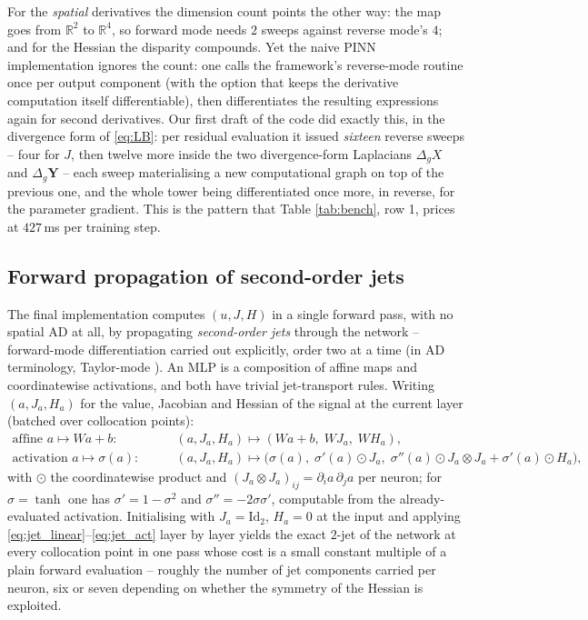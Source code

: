 \documentclass[oneside,british]{amsart}
\numberwithin{equation}{section}
\numberwithin{figure}{section}
\theoremstyle{plain}
\numberwithin{thm}{section}
\theoremstyle{plain}
\theoremstyle{plain}
\theoremstyle{definition}
\theoremstyle{remark}
\begin{document}
For the \emph{spatial} derivatives the dimension count points the other
way: the map goes from $\mathbb{R}^{2}$ to $\mathbb{R}^{4}$, so forward
mode needs $2$ sweeps against reverse mode's $4$; and for the Hessian
the disparity compounds. Yet the naive PINN implementation ignores the
count: one calls the framework's reverse-mode routine once per output
component (with the option that keeps the derivative computation itself
differentiable), then differentiates the resulting expressions again
for second derivatives. Our first draft of the code did exactly this, in
the divergence form of \eqref{eq:LB}: per residual evaluation it issued
\emph{sixteen} reverse sweeps -- four for $J$, then twelve more inside
the two divergence-form Laplacians $\Delta_{g}X$ and
$\Delta_{g}\boldsymbol{Y}$ -- each sweep materialising a new
computational graph on top of the previous one, and the whole tower
being differentiated once more, in reverse, for the parameter gradient.
This is the pattern that Table \ref{tab:bench}, row 1, prices at
$427$\,ms per training step.

\subsection{Forward propagation of second-order jets}\label{subsec:jets}

The final implementation computes $(u,J,H)$ in a single forward pass,
with no spatial AD at all, by propagating \emph{second-order jets}
through the network -- forward-mode differentiation carried out
explicitly, order two at a time (in AD terminology, Taylor-mode
\cite{griewank2008evaluating}). An MLP is a composition of affine maps
and coordinatewise activations, and both have trivial jet-transport
rules. Writing $(a,J_{a},H_{a})$ for the value, Jacobian and Hessian of
the signal at the current layer (batched over collocation points):
\begin{align}
\text{affine } a\mapsto Wa+b:\qquad & (a,J_{a},H_{a})\longmapsto(Wa+b,\;WJ_{a},\;WH_{a}),\label{eq:jet_linear}\\
\text{activation } a\mapsto\sigma(a):\qquad & (a,J_{a},H_{a})\longmapsto\bigl(\sigma(a),\;\sigma'(a)\odot J_{a},\;\sigma''(a)\odot J_{a}\otimes J_{a}+\sigma'(a)\odot H_{a}\bigr),\label{eq:jet_act}
\end{align}
with $\odot$ the coordinatewise product and
$(J_{a}\otimes J_{a})_{ij}=\partial_{i}a\,\partial_{j}a$ per neuron;
for $\sigma=\tanh$ one has $\sigma'=1-\sigma^{2}$ and
$\sigma''=-2\sigma\sigma'$, computable from the already-evaluated
activation. Initialising with $J_{a}=\mathrm{Id}_{2}$, $H_{a}=0$ at the
input and applying
\eqref{eq:jet_linear}--\eqref{eq:jet_act} layer by layer yields the
exact $2$-jet of the network at every collocation point in one pass
whose cost is a small constant multiple of a plain forward evaluation
-- roughly the number of jet components carried per neuron, six or
seven depending on whether the symmetry of the Hessian is exploited.
\end{document}
